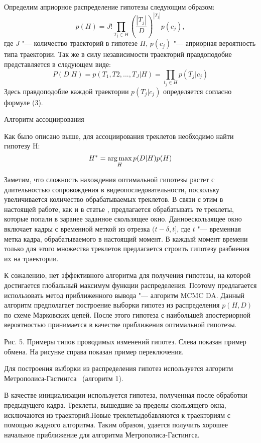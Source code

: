 Определим априорное распределение гипотезы следующим образом:
\begin{equation}
	p(H) = J!\prod_{T_j \in H}\left(\frac{\left|T_j\right|}{D}\right)^{\left|T_j\right|}p(c_j),
\end{equation}
где $J$ "--- количество траекторий в гипотезе $H$, $p(c_j)$ "--- априорная вероятность типа траектории. Так же в силу независимости траекторий правдоподобие представляется в
следующем виде:
\begin{equation}
	P(D|H) = p(T_1, T2, ..., T_J|H) = \prod_{t_j\in H}p(T_j|c_j)
\end{equation}
Здесь правдоподобие каждой траектории $p(T_j|c_j)$ определяется согласно формуле (3).

Алгоритм ассоциирования

Как было описано выше, для ассоциирования треклетов необходимо найти гипотезу H:
\begin{equation}
	H^* = \operatorname*{arg\,max}_H p(D|H)p(H)
\end{equation}

Заметим, что сложность нахождения оптимальной гипотезы растет с длительностью сопровождения в видеопоследовательности, поскольку увеличивается количество обрабатываемых треклетов. В связи с этим в настоящей работе, как и в статье \cite{benfold2011stable}, предлагается обрабатывать те треклеты, которые попали в заранее заданное скользящее окно. Данноескользящее окно включает кадры с временной меткой из отрезка $(t - \delta, t]$, где $t$ "--- временная метка кадра, обрабатываемого в настоящий момент. В каждый момент времени только для этого множества треклетов предлагается строить гипотезу разбиения их на траектории.

К сожалению, нет эффективного алгоритма для получения гипотезы, на которой достигается глобальный максимум функции распределения. Поэтому предлагается использовать метод приближенного вывода "--- алгоритм MCMC DA. Данный алгоритм предполагает построение выборки гипотез из распределения $p(H, D)$ по схеме Марковских цепей. После этого гипотеза с наибольшей апостериорной вероятностью принимается в качестве приближения оптимальной гипотезы.

Рис. 5. Примеры типов проводимых изменений гипотез. Слева показан пример обмена. На рисунке справа показан пример переключения.

Для построения выборки из распределения гипотез используется алгоритм Метрополиса-Гастингса~\cite{oh2004markov} (алгоритм 1).

В качестве инициализации используется гипотеза, полученная после обработки предыдущего кадра. Треклеты, вышедшие за пределы скользящего окна, исключаются из траекторий.Новые треклетыдобавляются к траекториям с помощью жадного алгоритма. Таким образом, удается получить хорошее начальное приближение для алгоритма Метрополиса-Гастингса.

